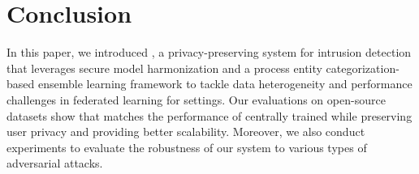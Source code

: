 \section{Conclusion}
\label{sec:conclusion}

In this paper, we introduced \Sys, a privacy-preserving system for intrusion detection that leverages secure \wordvec model harmonization and a process entity categorization-based \gnnshort ensemble learning framework to tackle data heterogeneity and performance challenges in federated learning for \pids settings. Our evaluations on open-source datasets show that \Sys matches the performance of centrally trained \pids while preserving user privacy and providing better scalability. Moreover, we also conduct experiments to evaluate the robustness of our system to various types of adversarial attacks.